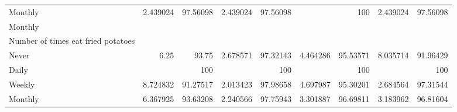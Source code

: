 \documentclass{article}
\begin{document}
\begin{tabular}{lllllllll}
\multicolumn{1}{l}{\hspace{7em}Monthly} &
  \multicolumn{1}{|r}{2.439024} &
  \multicolumn{1}{r}{97.56098} &
  \multicolumn{1}{r}{2.439024} &
  \multicolumn{1}{r}{97.56098} &
  \multicolumn{1}{r}{} &
  \multicolumn{1}{r}{100} &
  \multicolumn{1}{r}{2.439024} &
  \multicolumn{1}{r}{97.56098} \\
\multicolumn{1}{l}{\hspace{5em}Monthly} &
  \multicolumn{1}{|r}{} &
  \multicolumn{1}{r}{} &
  \multicolumn{1}{r}{} &
  \multicolumn{1}{r}{} &
  \multicolumn{1}{r}{} &
  \multicolumn{1}{r}{} &
  \multicolumn{1}{r}{} &
  \multicolumn{1}{r}{} \\
\multicolumn{1}{l}{\hspace{6em}Number of times eat fried potatoes} &
  \multicolumn{1}{|r}{} &
  \multicolumn{1}{r}{} &
  \multicolumn{1}{r}{} &
  \multicolumn{1}{r}{} &
  \multicolumn{1}{r}{} &
  \multicolumn{1}{r}{} &
  \multicolumn{1}{r}{} &
  \multicolumn{1}{r}{} \\
\multicolumn{1}{l}{\hspace{7em}Never} &
  \multicolumn{1}{|r}{6.25} &
  \multicolumn{1}{r}{93.75} &
  \multicolumn{1}{r}{2.678571} &
  \multicolumn{1}{r}{97.32143} &
  \multicolumn{1}{r}{4.464286} &
  \multicolumn{1}{r}{95.53571} &
  \multicolumn{1}{r}{8.035714} &
  \multicolumn{1}{r}{91.96429} \\
\multicolumn{1}{l}{\hspace{7em}Daily} &
  \multicolumn{1}{|r}{} &
  \multicolumn{1}{r}{100} &
  \multicolumn{1}{r}{} &
  \multicolumn{1}{r}{100} &
  \multicolumn{1}{r}{} &
  \multicolumn{1}{r}{100} &
  \multicolumn{1}{r}{} &
  \multicolumn{1}{r}{100} \\
\multicolumn{1}{l}{\hspace{7em}Weekly} &
  \multicolumn{1}{|r}{8.724832} &
  \multicolumn{1}{r}{91.27517} &
  \multicolumn{1}{r}{2.013423} &
  \multicolumn{1}{r}{97.98658} &
  \multicolumn{1}{r}{4.697987} &
  \multicolumn{1}{r}{95.30201} &
  \multicolumn{1}{r}{2.684564} &
  \multicolumn{1}{r}{97.31544} \\
\multicolumn{1}{l}{\hspace{7em}Monthly} &
  \multicolumn{1}{|r}{6.367925} &
  \multicolumn{1}{r}{93.63208} &
  \multicolumn{1}{r}{2.240566} &
  \multicolumn{1}{r}{97.75943} &
  \multicolumn{1}{r}{3.301887} &
  \multicolumn{1}{r}{96.69811} &
  \multicolumn{1}{r}{3.183962} &
  \multicolumn{1}{r}{96.81604} \\
\cline{1-9}
\end{tabular}
\end{document}
